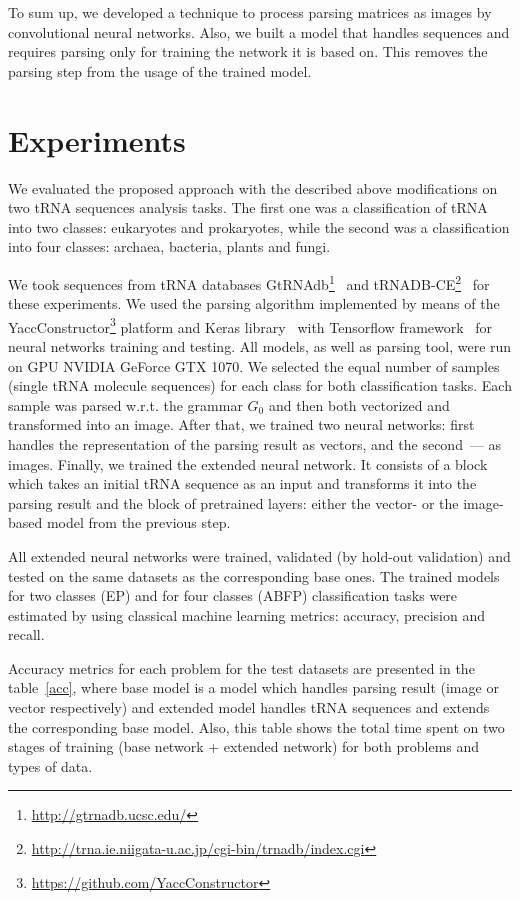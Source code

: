 \documentclass[runningheads]{llncs}
\begin{document}
To sum up, we developed a technique to process parsing matrices as images by convolutional neural networks. Also, we built a model that handles sequences and requires parsing only for training the network it is based on. This removes the parsing step from the usage of the trained model.

\section{Experiments}
We evaluated the proposed approach with the described above modifications on two tRNA sequences analysis tasks.
The first one was a classification of tRNA into two classes: eukaryotes and prokaryotes, while the second was a classification into four classes: archaea, bacteria, plants and fungi.


We took sequences from tRNA databases GtRNAdb\footnote{\url{http://gtrnadb.ucsc.edu/}}~\cite{chan2016gtrnadb} and tRNADB-CE\footnote{\url{http://trna.ie.niigata-u.ac.jp/cgi-bin/trnadb/index.cgi}}~\cite{abe2014trnadb} for these experiments. We used the parsing algorithm implemented by means of the YaccConstructor\footnote{\url{https://github.com/YaccConstructor}} platform and Keras library~\cite{chollet2015keras} with Tensorflow framework~\cite{tensorflow2015-whitepaper} for neural networks training and testing. All models, as well as parsing tool, were run on GPU NVIDIA GeForce GTX 1070.
We selected the equal number of samples (single tRNA molecule sequences) for each class for both classification tasks.
Each sample was parsed w.r.t. the grammar $G_0$ and then both vectorized and transformed into an image.
After that, we trained two neural networks: first handles the representation of the parsing result as vectors, and the second~--- as images.
Finally, we trained the extended neural network.
It consists of a block which takes an initial tRNA sequence as an input and transforms it into the parsing result and the block of pretrained layers: either the vector- or the image-based model from the previous step. 

All extended neural networks were trained, validated (by hold-out validation) and tested on the same datasets as the corresponding base ones.
The trained models for two classes (EP) and for four classes (ABFP) classification tasks were estimated by using classical machine learning metrics: accuracy, precision and recall.

Accuracy metrics for each problem for the test datasets are presented in the table~\ref{acc}, where base model is a model which handles parsing result (image or vector respectively) and extended model handles tRNA sequences and extends the corresponding base model. Also, this table shows the total time spent on two stages of training (base network + extended network) for both problems and types of data.
\end{document}
